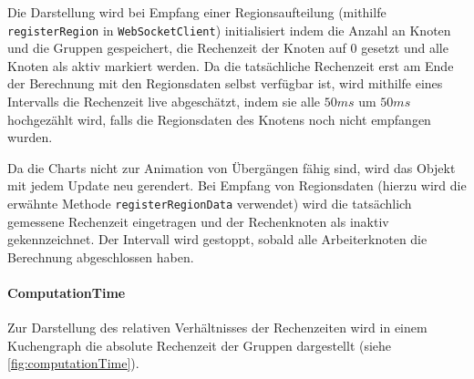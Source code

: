 Die Darstellung wird bei Empfang einer Regionsaufteilung (mithilfe \verb|registerRegion| in \verb|WebSocketClient|)
initialisiert indem die Anzahl an Knoten und die Gruppen gespeichert, die Rechenzeit der Knoten auf \( 0 \) gesetzt und
alle Knoten als aktiv markiert werden.
Da die tatsächliche Rechenzeit erst am Ende der Berechnung mit den Regionsdaten selbst verfügbar ist,
wird mithilfe eines Intervalls die Rechenzeit live abgeschätzt, indem sie alle \( 50ms \) um
\( 50ms \) hochgezählt wird, falls die Regionsdaten des Knotens noch nicht empfangen wurden.

Da die Charts nicht zur Animation von Übergängen fähig sind, wird das Objekt mit jedem Update neu gerendert.
Bei Empfang von Regionsdaten (hierzu wird die erwähnte Methode \verb|registerRegionData| verwendet)
wird die tatsächlich gemessene Rechenzeit eingetragen und der Rechenknoten als inaktiv gekennzeichnet.
Der Intervall wird gestoppt, sobald alle Arbeiterknoten die Berechnung abgeschlossen haben.

\paragraph{ComputationTime}

Zur Darstellung des relativen Verhältnisses der Rechenzeiten wird in einem Kuchengraph
die absolute Rechenzeit der Gruppen dargestellt (siehe \autoref{fig:computationTime}).
